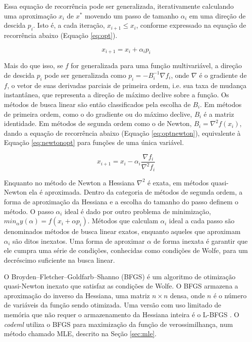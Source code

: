\documentclass[cic,tc]{iiufrgs}
\begin{document}
Essa equação de recorrência pode ser generalizada, iterativamente calculando
uma aproximação $x_i$ de $x^*$ movendo um passo de tamanho $\alpha_i$ em uma
direção de descida $p_i$. Isto é, a cada iteração, $x_{i+1} \le x_i$, conforme
expressado na equação de recorrência abaixo (Equação \ref{eq:opt}).

\begin{equation}
\label{eq:opt}
x_{i + 1} = x_i + \alpha_i p_i
\end{equation}

Mais do que isso, se $f$ for generalizada para uma função multivariável, a
direção de descida $p_i$ pode ser generalizada como $p_i = -B_{i}^{-1} \nabla
f_i$, onde $\nabla$ é o gradiente de $f$, o vetor de suas derivadas parciais de
primeira ordem, i.e. sua taxa de mudança instantânea, que representa a direção
de máximo declive sobre a função. Os métodos de busca linear são então
classificados pela escolha de $B_i$. Em métodos de primeira ordem, como o do
gradiente ou do máximo declive, $B_i$ é a matriz identidade. Em métodos de
segunda ordem como o de Newton, $B_i = \nabla^2 f(x_i)$, dando a equação de
recorrência abaixo (Equação \ref{eq:optnewton}), equivalente à Equação
\ref{eq:newtonopt} para funções de uma única variável.

\begin{equation}
\label{eq:optnewton}
x_{i + 1} = x_i - \alpha_i \frac{\nabla f_i}{\nabla^2 f_i}
\end{equation}

Enquanto no método de Newton a Hessiana $\nabla^2$ é exata, em métodos
quasi-Newton ela é aproximada. Dentro da categoria de métodos de segunda ordem,
a forma de aproximação da Hessiana e a escolha do tamanho do passo definem o
método. O passo $\alpha_i$ ideal é dado por outro problema de minimização,
$min_\alpha y(\alpha) = f(x_i + \alpha p_i)$. Métodos que calculam $\alpha_i$
ideal a cada passo são denominados métodos de busca linear exatos, enquanto
aqueles que aproximam $\alpha_i$ são ditos inexatos. Uma forma de aproximar
$\alpha$ de forma inexata é garantir que ele cumpra uma série de condições,
conhecidas como condições de Wolfe, para um decréscimo suficiente na busca
linear.

O Broyden–Fletcher–Goldfarb–Shanno (BFGS) \cite{fletcher1980practical} é um
algoritmo de otimização quasi-Newton inexato que satisfaz as condições de
Wolfe. O BFGS armazena a aproximação do inverso da Hessiana, uma matriz $n
\times n$ densa, onde $n$ é o número de variáveis da função sendo otimizada.
Uma versão com uso limitado de memória que não requer o armazenamento da
Hessiana inteira é o L-BFGS \cite{liu1989limited}. O \textit{codeml} utiliza o BFGS para
maximização da função de verossimilhança, num método chamado MLE, descrito na
Seção \ref{sec:mle}.
\end{document}
